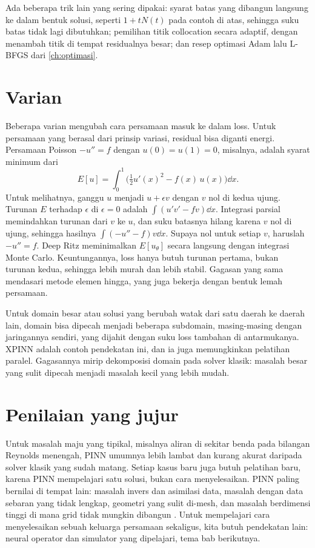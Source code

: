 Ada beberapa trik lain yang sering dipakai: syarat batas yang dibangun langsung ke dalam bentuk solusi,
seperti $1+tN(t)$ pada contoh di atas, sehingga suku batas tidak lagi dibutuhkan; pemilihan titik
collocation secara adaptif, dengan menambah titik di tempat residualnya besar; dan resep optimasi Adam
lalu L-BFGS dari \cref{ch:optimasi}.

\section{Varian}

Beberapa varian mengubah cara persamaan masuk ke dalam loss. Untuk persamaan yang berasal dari prinsip variasi,
residual bisa diganti energi. Persamaan Poisson $-u''=f$ dengan $u(0)=u(1)=0$, misalnya, adalah syarat minimum dari
\begin{equation}
E[u]=\int_0^1\Big(\tfrac12u'(x)^2-f(x)\,u(x)\Big)\dd x .
\end{equation}
Untuk melihatnya, ganggu $u$ menjadi $u+\epsilon v$ dengan $v$ nol di kedua ujung. Turunan $E$ terhadap $\epsilon$ di
$\epsilon=0$ adalah $\int(u'v'-fv)\dd x$. Integrasi parsial memindahkan turunan dari $v$ ke $u$, dan suku batasnya
hilang karena $v$ nol di ujung, sehingga hasilnya $\int(-u''-f)v\dd x$. Supaya nol untuk setiap $v$, haruslah
$-u''=f$. Deep Ritz \citep{e2018} meminimalkan $E[u_\theta]$ secara langsung dengan integrasi Monte Carlo. Keuntungannya,
loss hanya butuh turunan pertama, bukan turunan kedua, sehingga lebih murah dan lebih stabil. Gagasan yang sama
mendasari metode elemen hingga, yang juga bekerja dengan bentuk lemah persamaan.

Untuk domain besar atau solusi yang berubah watak dari satu daerah ke daerah lain, domain bisa dipecah menjadi
beberapa subdomain, masing-masing dengan jaringannya sendiri, yang dijahit dengan suku loss tambahan di
antarmukanya. XPINN \citep{jagtap2020} adalah contoh pendekatan ini, dan ia juga memungkinkan pelatihan paralel.
Gagasannya mirip dekomposisi domain pada solver klasik: masalah besar yang sulit dipecah menjadi masalah kecil
yang lebih mudah.

\section{Penilaian yang jujur}

Untuk masalah maju yang tipikal, misalnya aliran di sekitar benda pada bilangan Reynolds menengah, PINN
umumnya lebih lambat dan kurang akurat daripada solver klasik yang sudah matang. Setiap kasus baru juga
butuh pelatihan baru, karena PINN mempelajari satu solusi, bukan cara menyelesaikan. PINN paling
bernilai di tempat lain: masalah invers dan asimilasi data, masalah dengan data sebaran yang tidak
lengkap, geometri yang sulit di-mesh, dan masalah berdimensi tinggi di mana grid tidak mungkin dibangun
\citep{karniadakis2021}. Untuk mempelajari cara menyelesaikan sebuah keluarga persamaan sekaligus,
kita butuh pendekatan lain: neural operator dan simulator yang dipelajari, tema bab berikutnya.

